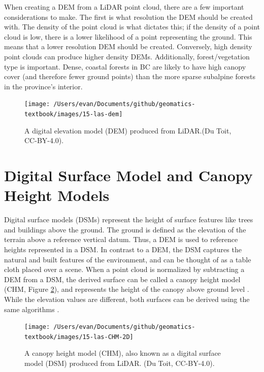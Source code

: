\documentclass[
]{book}
\begin{document}
When creating a DEM from a LiDAR point cloud, there are a few important considerations to make. The first is what resolution the DEM should be created with. The density of the point cloud is what dictates this; if the density of a point cloud is low, there is a lower likelihood of a point representing the ground. This means that a lower resolution DEM should be created. Conversely, high density point clouds can produce higher density DEMs. Additionally, forest/vegetation type is important. Dense, coastal forests in BC are likely to have high canopy cover (and therefore fewer ground points) than the more sparse subalpine forests in the province's interior.

\begin{figure}
\texttt{[image: /Users/evan/Documents/github/geomatics-textbook/images/15-las-dem]} \caption{A digital elevation model (DEM) produced from LiDAR.(Du Toit, CC-BY-4.0).}\label{fig:15-las-dem}
\end{figure}

\hypertarget{digital-surface-model-and-canopy-height-models}{%
\section{Digital Surface Model and Canopy Height Models}\label{digital-surface-model-and-canopy-height-models}}

Digital surface models (DSMs) represent the height of surface features like trees and buildings above the ground. The ground is defined as the elevation of the terrain above a reference vertical datum. Thus, a DEM is used to reference heights represented in a DSM. In contrast to a DEM, the DSM captures the natural and built features of the environment, and can be thought of as a table cloth placed over a scene. When a point cloud is normalized by subtracting a DEM from a DSM, the derived surface can be called a canopy height model (CHM, Figure \ref{fig:15-las-CHM-2D}), and represents the height of the canopy above ground level \citep{White2013}. While the elevation values are different, both surfaces can be derived using the same algorithms \citep{Roussel2021}.

\begin{figure}
\texttt{[image: /Users/evan/Documents/github/geomatics-textbook/images/15-las-CHM-2D]} \caption{A canopy height model (CHM), also known as a digital surface model (DSM) produced from LiDAR. (Du Toit, CC-BY-4.0).}\label{fig:15-las-CHM-2D}
\end{figure}
\end{document}
